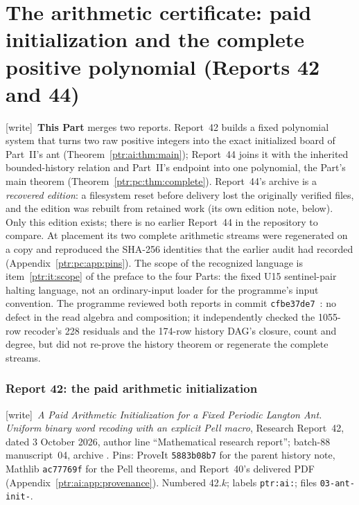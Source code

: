 \documentclass[11pt,letterpaper]{article}
\makeatletter
\newcommand{\ptrhead}{Front matter}
\theoremstyle{definition}\newtheorem{definition}[theorem]{Definition}
\theoremstyle{remark}\newtheorem{remark}[theorem]{Remark}
\newcommand{\ptrR}{}
\newcommand{\ptrstart}[2]{%
  \renewcommand{\ptrR}{#1}\setcounter{section}{0}\setcounter{equation}{0}%
  \def\Hy@chapapp{section}%
  \renewcommand{\thesection}{#1.\arabic{section}}%
  \renewcommand{\theHsection}{#1.\arabic{section}}%
  \renewcommand{\theequation}{#1.\arabic{equation}}%
  \renewcommand{\theHequation}{#1.\arabic{equation}}%
  \renewcommand{\ptrhead}{#2}}
\newcommand{\wtag}{\textup{[write]}}
\makeatother
\begin{document}
\part{The arithmetic certificate: paid initialization and the complete positive polynomial (Reports 42 and 44)}\label{ptr:part:cert}
\ptrstart{42}{Part III: Report 42}
\label{ptr:ai:sec:intro}
\noindent\wtag\ \textbf{This Part} merges two reports. Report~42 builds a
fixed polynomial system that turns two raw positive integers into the exact
initialized board of Part~II's ant (Theorem~\ref{ptr:ai:thm:main}); Report~44
joins it with the inherited bounded-history relation and Part~II's endpoint
into one polynomial, the Part's main theorem (Theorem~\ref{ptr:pc:thm:complete}).
Report~44's archive is a \emph{recovered edition}: a filesystem reset before
delivery lost the originally verified files, and the edition was rebuilt
from retained work (its own edition note, below). Only this edition exists;
there is no earlier Report~44 in the repository to compare. At placement its
two complete arithmetic streams were regenerated on a copy and reproduced the
SHA-256 identities that the earlier audit had recorded
(Appendix~\ref{ptr:pc:app:pins}). The scope of the recognized language is
item~\ref{ptr:it:scope} of the preface to the four Parts: the fixed U15
sentinel-pair halting language, not an ordinary-input loader for the
programme's input convention. The programme reviewed both reports in commit
\texttt{cfbe37de7}~\cite{ptr:w:rev4048}: no defect in the read algebra and
composition; it independently checked the 1055-row recoder's 228 residuals
and the 174-row history DAG's closure, count and degree, but did not re-prove
the history theorem or regenerate the complete streams.

\section*{Report 42: the paid arithmetic initialization}
\noindent\wtag\ \emph{A Paid Arithmetic Initialization for a
Fixed Periodic Langton Ant. Uniform binary word recoding with an explicit Pell
macro}, Research Report~42, dated 3 October 2026, author line ``Mathematical
research report''; batch-88 manuscript~04, archive
. Pins:
ProveIt \texttt{5883b08b7} for the parent history note, Mathlib
\texttt{ac77769f} for the Pell theorems, and Report~40's delivered PDF
(Appendix~\ref{ptr:ai:app:provenance}). Numbered 42.$k$; labels
\texttt{ptr:ai:}; files \texttt{03-ant-init-}.
\end{document}
